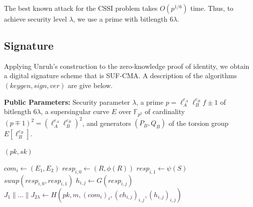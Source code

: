 \documentclass[runningheads,a4paper]{llncs}
\begin{document}
The best known attack for the CSSI problem takes $O(p^{1/6})$ time. Thus, to achieve security level $\lambda$, we use a prime with bitlength $6\lambda$.



\subsection{Signature}
Applying Unruh's construction to the zero-knowledge proof of identity, we obtain a digital signature scheme that is SUF-CMA. A description of the algorithms $(keygen,sign,ver)$ are give below.

\vspace{2mm}
{\bf Public Parameters:} Security parameter $\lambda$, a prime $p = \ell_A^{e_A}\ell_B^{e_B}f \pm 1$ of bitlength $6\lambda$, a supersingular curve $E$ over $\mathbb{F}_{p^2}$ of cardinality $(p \mp 1)^2 = (\ell_A^{e_A}\ell_B^{e_B})^2$, and generators $(P_B,Q_B)$ of the torsion group $E[\ell_B^{e_B}]$.

\begin{algorithm}[ht]
\caption{$keygen(\lambda)$}
\begin{algorithmic}
\RETURN $(pk,sk)$
\end{algorithmic}
\end{algorithm}

\begin{algorithm}[ht]
\caption{$sign(sk,m)$}
\begin{algorithmic}
	\STATE $com_i \leftarrow (E_1,E_2)$
	\STATE $resp_{i,0} \leftarrow (R,\phi(R))$
	\STATE $resp_{i,1} \leftarrow \psi(S)$
		\STATE $swap(resp_{i,0},resp_{i,1})$
	\ENDIF
	\STATE $h_{i,j} \leftarrow G(resp_{i,j})$
\ENDFOR
\vspace{2mm}
\STATE $J_1 \| \dots \| J_{2\lambda} \leftarrow H(pk,m, (com_i)_i, (ch_{i,j})_{i,j}, (h_{i,j})_{i,j})$ 
\vspace{2mm}
\end{algorithmic}
\end{algorithm}
\end{document}
